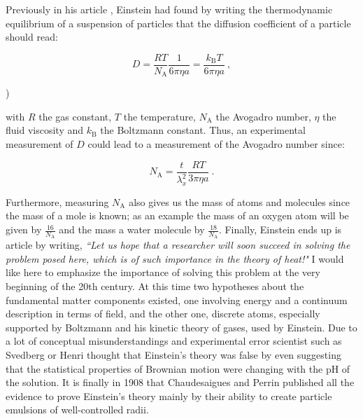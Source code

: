 Previously in his article \cite{einstein_uber_1905}, Einstein had found by writing the thermodynamic equilibrium of a suspension of particles that the diffusion coefficient of a particle should read:

\begin{equation}
	D = \frac{R T}{N_\mathrm{A}}\frac{1}{6\pi \eta a} = \frac{k_\mathrm{B}T}{6 \pi \eta a}
	~,
	\label{Eq:D_einstein}
\end{equation}

)

with $R$ the gas constant, $T$ the temperature, $N_\mathrm{A}$ the Avogadro number, $\eta$ the fluid viscosity and $k_\mathrm{B}$ the Boltzmann constant. Thus, an experimental measurement of $D$ could lead to a measurement of the Avogadro number since:

\begin{equation}
	N_\mathrm{A} = \frac{t}{\lambda_x^2} \frac{RT}{3\pi \eta a} ~.
\end{equation}

Furthermore, measuring $N_\mathrm{A}$ also gives us the mass of atoms and molecules since the mass of a mole is known; as an example the mass of an oxygen atom will be given by $\frac{16}{N_\mathrm{A}}$ and the mass a water molecule by $\frac{18}{N_\mathrm{A}}$. Finally, Einstein ends up is article \cite{einstein_uber_1905} by writing, \textit{``Let us hope that a researcher will soon succeed in solving the problem posed here, which is of such importance in the theory of heat!"} I would like here to emphasize the importance of solving this problem at the very beginning of the 20th century. At this time two hypotheses about the fundamental matter components existed, one involving energy and a continuum description in terms of field, and the other one, discrete atoms, especially supported by Boltzmann and his kinetic theory of gases, used by Einstein. Due to a lot of conceptual misunderstandings and experimental error scientist such as Svedberg or Henri thought that Einstein's theory was false \cite{genthon_concept_2020} by even suggesting that the statistical properties of Brownian motion were changing with the pH of the solution. It is finally in 1908 that Chaudesaigues and Perrin published all the evidence to prove Einstein's theory mainly by their ability to create particle emulsions of well-controlled radii. 

